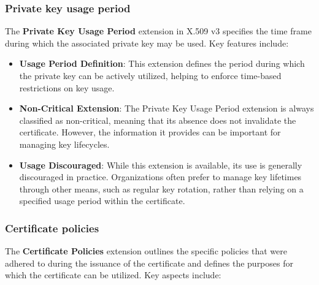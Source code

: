 \subsubsection{Private key usage period}

The \textbf{Private Key Usage Period} extension in X.509 v3 specifies the
time frame during which the associated private key may be used. Key
features include:

\begin{itemize}
  \item \textbf{Usage Period Definition}: This extension defines the
    period during which the private key can be actively utilized,
    helping to enforce time-based restrictions on key usage.

  \item \textbf{Non-Critical Extension}: The Private Key Usage
    Period extension is always classified as non-critical, meaning
    that its absence does not invalidate the certificate. However,
    the information it provides can be important for managing key
    lifecycles.

  \item \textbf{Usage Discouraged}: While this extension is
    available, its use is generally discouraged in practice.
    Organizations often prefer to manage key lifetimes through other
    means, such as regular key rotation, rather than relying on a
    specified usage period within the certificate.
\end{itemize}

\subsubsection{Certificate policies}

The \textbf{Certificate Policies} extension outlines the specific
policies that were adhered to during the issuance of the certificate
and defines the purposes for which the certificate can be utilized.
Key aspects include:

